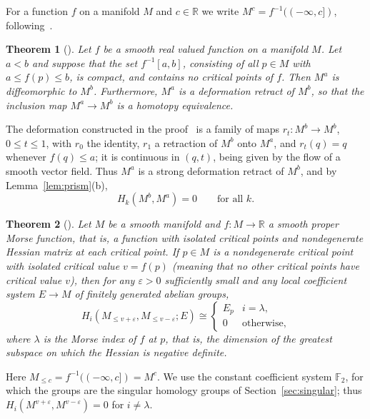 \documentclass[11pt]{article}
\newtheorem{theorem}{Theorem}[section]
\theoremstyle{definition}
\numberwithin{equation}{section}
\newcommand{\F}{\mathbb F_2}
\newcommand{\R}{\mathbb R}
\begin{document}
For a function $f$ on a manifold $M$ and $c\in\R$ we write $M^c=f^{-1}((-\infty,c])$, following~\cite{Milnor}.

\begin{theorem}[{\cite[Theorem~3.1, p.~12]{Milnor}}]\label{thm:milnor}
Let $f$ be a smooth real valued function on a manifold $M$. Let $a<b$ and suppose that the set $f^{-1}[a,b]$, consisting of all $p\in M$ with $a\le f(p)\le b$, is compact, and contains no critical points of $f$. Then $M^a$ is diffeomorphic to $M^b$. Furthermore, $M^a$ is a deformation retract of $M^b$, so that the inclusion map $M^a\to M^b$ is a homotopy equivalence.
\end{theorem}

The deformation constructed in the proof~\cite[pp.~12--13]{Milnor} is a family of maps $r_t:M^b\to M^b$, $0\le t\le1$, with $r_0$ the identity, $r_1$ a retraction of $M^b$ onto $M^a$, and $r_t(q)=q$ whenever $f(q)\le a$; it is continuous in $(q,t)$, being given by the flow of a smooth vector field. Thus $M^a$ is a strong deformation retract of $M^b$, and by Lemma~\ref{lem:prism}(b),
\begin{equation}\label{eq:milnor}
 H_k(M^b,M^a)=0\qquad\text{for all }k.
\end{equation}

\begin{theorem}[{\cite[\S1.3.1, Theorem~1 and the display following it, p.~2]{Goresky}}]\label{thm:goresky}
Let $M$ be a smooth manifold and $f:M\to\R$ a smooth proper Morse function, that is, a function with isolated critical points and nondegenerate Hessian matrix at each critical point. If $p\in M$ is a nondegenerate critical point with isolated critical value $v=f(p)$ (meaning that no other critical points have critical value $v$), then for any $\varepsilon>0$ sufficiently small and any local coefficient system $E\to M$ of finitely generated abelian groups,
\begin{equation*}
 H_i(M_{\le v+\varepsilon},M_{\le v-\varepsilon};E)\cong\begin{cases}E_p&i=\lambda,\\0&\text{otherwise,}\end{cases}
\end{equation*}
where $\lambda$ is the Morse index of $f$ at $p$, that is, the dimension of the greatest subspace on which the Hessian is negative definite.
\end{theorem}

Here $M_{\le c}=f^{-1}((-\infty,c])=M^c$. We use the constant coefficient system $\F$, for which the groups are the singular homology groups of Section~\ref{sec:singular}; thus $H_i(M^{v+\varepsilon},M^{v-\varepsilon})=0$ for $i\ne\lambda$.
\end{document}
